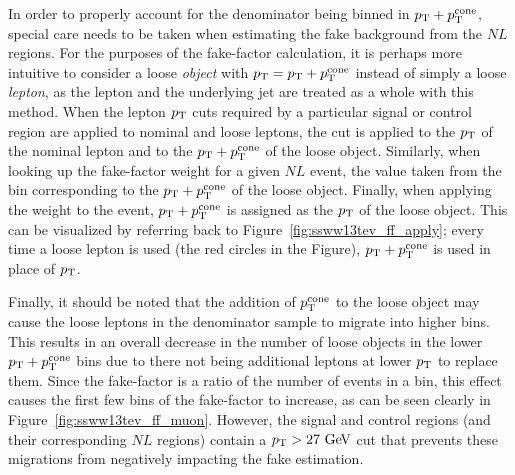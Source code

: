 In order to properly account for the denominator being binned in $p_{\mathrm{T}}+p_{\mathrm{T}}^{\textrm{cone}}$, special care needs to be taken when estimating the fake background from the $NL$ regions.
For the purposes of the fake-factor calculation, it is perhaps more intuitive to consider a loose \emph{object} with $p_{\mathrm{T}}=p_{\mathrm{T}}+p_{\mathrm{T}}^{\textrm{cone}}$ instead of simply a loose \emph{lepton}, as the lepton and the underlying jet are treated as a whole with this method.
When the lepton $p_{\mathrm{T}}$ cuts required by a particular signal or control region are applied to nominal and loose leptons, the cut is applied to the $p_{\mathrm{T}}$ of the nominal lepton and to the $p_{\mathrm{T}}+p_{\mathrm{T}}^{\textrm{cone}}$ of the loose object.
Similarly, when looking up the fake-factor weight for a given $NL$ event, the value taken from the bin corresponding to the $p_{\mathrm{T}}+p_{\mathrm{T}}^{\textrm{cone}}$ of the loose object.
Finally, when applying the weight to the event, $p_{\mathrm{T}}+p_{\mathrm{T}}^{\textrm{cone}}$ is assigned as the $p_{\mathrm{T}}$ of the loose object.
This can be visualized by referring back to Figure~\ref{fig:ssww13tev_ff_apply}; every time a loose lepton is used (the red circles in the Figure), $p_{\mathrm{T}}+p_{\mathrm{T}}^{\textrm{cone}}$ is used in place of $p_{\mathrm{T}}$.


Finally, it should be noted that the addition of $p_{\mathrm{T}}^{\textrm{cone}}$ to the loose object may cause the loose leptons in the denominator sample to migrate into higher bins.
This results in an overall decrease in the number of loose objects in the lower $p_{\mathrm{T}}+p_{\mathrm{T}}^{\textrm{cone}}$ bins due to there not being additional leptons at lower $p_{\mathrm{T}}$ to replace them.
Since the fake-factor is a ratio of the number of events in a bin, this effect causes the first few bins of the fake-factor to increase, as can be seen clearly in Figure~\ref{fig:ssww13tev_ff_muon}.
However, the signal and control regions (and their corresponding $NL$ regions) contain a $\pt > 27\gev$ cut that prevents these migrations from negatively impacting the fake estimation.

